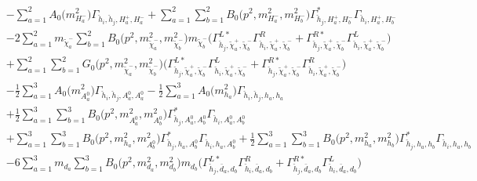 \begin{itemize}
\begin{align}
 &- \sum_{a=1}^{2}{A_0\Big(m^2_{H^-_{{a}}}\Big)} {\Gamma_{\check{h}_{{i}},\check{h}_{{j}},H^+_{{a}},H^-_{{a}}}}  +\sum_{a=1}^{2}\sum_{b=1}^{2}{B_0\Big(p^{2},m^2_{H^-_{{a}}},m^2_{H^-_{{b}}}\Big)} {\Gamma^*_{\check{h}_{{j}},H^+_{{a}},H^-_{{b}}}} {\Gamma_{\check{h}_{{i}},H^+_{{a}},H^-_{{b}}}} \nonumber \\ 
 &-2 \sum_{a=1}^{2}m_{\tilde{\chi}^-_{{a}}} \sum_{b=1}^{2}{B_0\Big(p^{2},m^2_{\tilde{\chi}^-_{{a}}},m^2_{\tilde{\chi}^-_{{b}}}\Big)} m_{\tilde{\chi}^-_{{b}}} \Big({\Gamma^{L*}_{\check{h}_{{j}},\tilde{\chi}^+_{{a}},\tilde{\chi}^-_{{b}}}} {\Gamma^R_{\check{h}_{{i}},\tilde{\chi}^+_{{a}},\tilde{\chi}^-_{{b}}}}  + {\Gamma^{R*}_{\check{h}_{{j}},\tilde{\chi}^+_{{a}},\tilde{\chi}^-_{{b}}}} {\Gamma^L_{\check{h}_{{i}},\tilde{\chi}^+_{{a}},\tilde{\chi}^-_{{b}}}} \Big)  \nonumber \\ 
 &+\sum_{a=1}^{2}\sum_{b=1}^{2}{G_0\Big(p^{2},m^2_{\tilde{\chi}^-_{{a}}},m^2_{\tilde{\chi}^-_{{b}}}\Big)} \Big({\Gamma^{L*}_{\check{h}_{{j}},\tilde{\chi}^+_{{a}},\tilde{\chi}^-_{{b}}}} {\Gamma^L_{\check{h}_{{i}},\tilde{\chi}^+_{{a}},\tilde{\chi}^-_{{b}}}}  + {\Gamma^{R*}_{\check{h}_{{j}},\tilde{\chi}^+_{{a}},\tilde{\chi}^-_{{b}}}} {\Gamma^R_{\check{h}_{{i}},\tilde{\chi}^+_{{a}},\tilde{\chi}^-_{{b}}}} \Big)\nonumber \\ 
 &-\frac{1}{2} \sum_{a=1}^{3}{A_0\Big(m^2_{A^0_{{a}}}\Big)} {\Gamma_{\check{h}_{{i}},\check{h}_{{j}},A^0_{{a}},A^0_{{a}}}}  -\frac{1}{2} \sum_{a=1}^{3}{A_0\Big(m^2_{h_{{a}}}\Big)} {\Gamma_{\check{h}_{{i}},\check{h}_{{j}},h_{{a}},h_{{a}}}}  \nonumber \\ 
 &+\frac{1}{2} \sum_{a=1}^{3}\sum_{b=1}^{3}{B_0\Big(p^{2},m^2_{A^0_{{a}}},m^2_{A^0_{{b}}}\Big)} {\Gamma^*_{\check{h}_{{j}},A^0_{{a}},A^0_{{b}}}} {\Gamma_{\check{h}_{{i}},A^0_{{a}},A^0_{{b}}}}  \nonumber \\ 
 &+\sum_{a=1}^{3}\sum_{b=1}^{3}{B_0\Big(p^{2},m^2_{h_{{a}}},m^2_{A^0_{{b}}}\Big)} {\Gamma^*_{\check{h}_{{j}},h_{{a}},A^0_{{b}}}} {\Gamma_{\check{h}_{{i}},h_{{a}},A^0_{{b}}}} +\frac{1}{2} \sum_{a=1}^{3}\sum_{b=1}^{3}{B_0\Big(p^{2},m^2_{h_{{a}}},m^2_{h_{{b}}}\Big)} {\Gamma^*_{\check{h}_{{j}},h_{{a}},h_{{b}}}} {\Gamma_{\check{h}_{{i}},h_{{a}},h_{{b}}}}  \nonumber \\ 
 &-6 \sum_{a=1}^{3}m_{d_{{a}}} \sum_{b=1}^{3}{B_0\Big(p^{2},m^2_{d_{{a}}},m^2_{d_{{b}}}\Big)} m_{d_{{b}}} \Big({\Gamma^{L*}_{\check{h}_{{j}},\bar{d}_{{a}},d_{{b}}}} {\Gamma^R_{\check{h}_{{i}},\bar{d}_{{a}},d_{{b}}}}  + {\Gamma^{R*}_{\check{h}_{{j}},\bar{d}_{{a}},d_{{b}}}} {\Gamma^L_{\check{h}_{{i}},\bar{d}_{{a}},d_{{b}}}} \Big)  \nonumber \\ 

\end{align}
\end{itemize}
